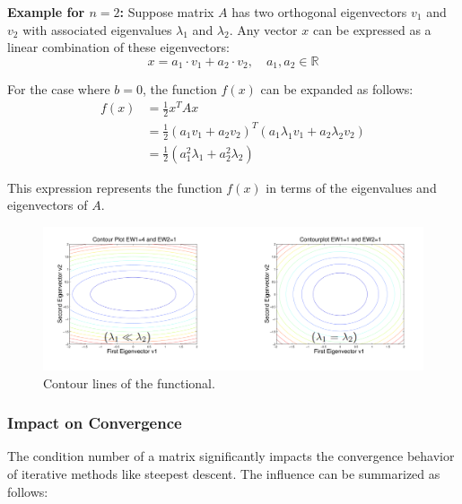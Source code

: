 \documentclass[unicode,11pt,a4paper,oneside,numbers=endperiod,openany]{scrartcl}
\begin{document}
\textbf{Example for \( n = 2 \):}
Suppose matrix \( A \) has two orthogonal eigenvectors \( v_1 \) and \( v_2 \) with associated eigenvalues \( \lambda_1 \) and \( \lambda_2 \). Any vector \( x \) can be expressed as a linear combination of these eigenvectors:
\[
x = a_1 \cdot v_1 + a_2 \cdot v_2, \quad a_1, a_2 \in \mathbb{R}
\]

For the case where \( b = 0 \), the function \( f(x) \) can be expanded as follows:
\begin{align*}
f(x) &= \frac{1}{2}x^T A x \\
&= \frac{1}{2}(a_1 v_1 + a_2 v_2)^T (a_1 \lambda_1 v_1 + a_2 \lambda_2 v_2) \\
&= \frac{1}{2}(a_1^2 \lambda_1 + a_2^2 \lambda_2)
\end{align*}

This expression represents the function \( f(x) \) in terms of the eigenvalues and eigenvectors of \( A \).

\begin{figure}[H]
    \centering
    \includegraphics[trim=0cm 0cm 0cm 0cm, clip, width=15cm]{img7.png}
    \caption{Contour lines of the functional.}
    \label{fig:img7}
\end{figure}

\subsubsection{Impact on Convergence}

The condition number of a matrix significantly impacts the convergence behavior of iterative methods like steepest descent. The influence can be summarized as follows:
\end{document}

